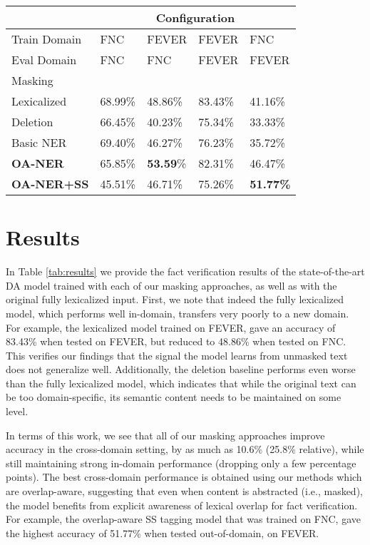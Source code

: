 \documentclass[11pt,a4paper]{article}
\begin{document}
\begin{table*}[ht]
\begin{center}
\begin{tabular}{p{22mm}|p{9mm}p{9mm}p{9mm}p{9mm}}
 & \multicolumn{4}{c}{Configuration} \\
 \hline
Train Domain & {FNC}& {FEVER}  & {FEVER} & {{FNC}} \\ 
Eval Domain & {FNC}& {{FNC}}  & {FEVER} & {{FEVER}} \\ \hline
Masking & & & & \\
\hline
Lexicalized &68.99\%& {48.86\%} &83.43\%& {41.16\%} \\
Deletion  &66.45\%& 40.23\% &75.34\%& 33.33\% \\
Basic NER &69.40\%& 46.27\% &76.23\%& 35.72\%\\
\textbf{OA-NER} &65.85\%& \textbf{53.59}\% &{82.31\%}& {46.47\%}\\
\textbf{OA-NER+SS} & 45.51\%& 46.71\% &75.26\%& {\bf 51.77\%}\\
\end{tabular}
\end{center}
    \caption{\label{crossdomain} Various masking techniques and their performance accuracies, both in-domain and out-of-domain.} \label{tab:results}

\end{table*}

\section{Results} 
\label{sec:results}

In Table \ref{tab:results} we provide the fact verification results of the state-of-the-art DA model trained with each of our masking approaches, as well as with the original fully lexicalized input.  
First, we note that indeed the fully lexicalized model, which performs well in-domain, transfers very poorly to a new domain.  
For example, the lexicalized model trained on FEVER,  gave an accuracy of 83.43\% when tested on FEVER, but reduced to 48.86\% when tested on FNC.
This verifies our findings that the signal the model learns from unmasked text does not generalize well.
Additionally, the deletion baseline performs even worse than the fully lexicalized model, which indicates that while the original text can be too domain-specific, its semantic content needs to be maintained on some level.

In terms of this work, we see that all of our masking approaches improve accuracy in the cross-domain setting, by as much as 10.6\% (25.8\% relative), while still maintaining strong in-domain performance (dropping only a few percentage points).
The best cross-domain performance is obtained using our methods which are overlap-aware, suggesting that even when content is abstracted (i.e., masked), the model benefits from explicit awareness of lexical overlap for fact verification. For example, the overlap-aware SS tagging model that was trained on FNC, gave the highest accuracy of 51.77\% when tested out-of-domain, on FEVER.
\end{document}
